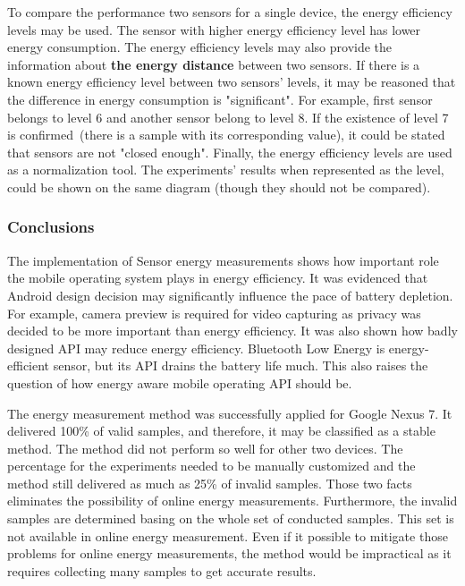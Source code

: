 To compare the performance two sensors for a single device, the energy efficiency levels may be used. The sensor with higher energy efficiency level has lower energy consumption. The energy efficiency levels may also provide the information about \textbf{the energy distance} between two sensors. If there is a known energy efficiency level between two sensors' levels, it may be reasoned that the difference in energy consumption is "significant". For example, first sensor belongs to level 6 and another sensor belong to level 8. If the existence of level 7 is confirmed\ (there is a sample with its corresponding value), it could be stated that sensors are not "closed enough". Finally, the energy efficiency levels are used as a normalization tool. The experiments' results when represented as the level, could be shown on the same diagram (though they should not be compared). 

   
\subsubsection{Conclusions}   
\hspace{10pt} The implementation of Sensor energy measurements shows how important role the mobile operating system plays in energy efficiency. It was evidenced that Android design decision may significantly influence the pace of battery depletion. For example, camera preview is required for video capturing as privacy was decided to be more important than energy efficiency. It was also shown how badly designed API may reduce energy efficiency. Bluetooth Low Energy is energy-efficient sensor, but its API drains the battery life much. This also raises the question of how energy aware mobile operating API should be.

The energy measurement method was successfully applied for Google Nexus 7. It delivered 100\% of valid samples, and therefore, it may be classified as a stable method. The method did not perform so well for other two devices. The percentage for the experiments needed to be manually customized and the method still delivered as much as 25\% of invalid samples. Those two facts eliminates the possibility of online energy measurements. Furthermore, the invalid samples are determined basing on the whole set of conducted samples. This set is not available in online energy measurement. Even if it possible to mitigate those problems for online energy measurements, the method would be impractical as it requires collecting many samples to get accurate results.  

